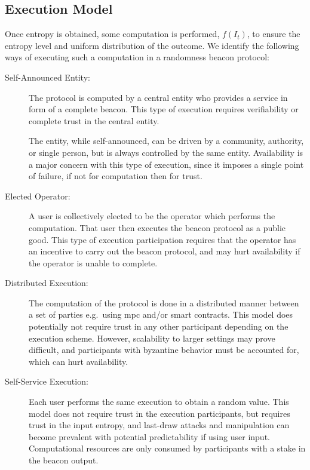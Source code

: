 \subsection{Execution Model}
Once entropy is obtained, some computation is performed, $f(I_t)$, to ensure the entropy level and uniform distribution of the outcome.
We identify the following ways of executing such a computation in a randomness beacon protocol:

\begin{description}
    \item[Self-Announced Entity:]
        The protocol is computed by a central entity who provides a service in form of a complete beacon.
        This type of execution requires verifiability or complete trust in the central entity.

        The entity, while self-announced, can be driven by a community, authority, or single person, but is always controlled by the same entity.
        Availability is a major concern with this type of execution, since it imposes a single point of failure, if not for computation then for trust.

    \item[Elected Operator:]
        A user is collectively elected to be the operator which performs the computation.
        That user then executes the beacon protocol as a public good.
        This type of execution participation requires that the operator has an incentive to carry out the beacon protocol, and may hurt availability if the operator is unable to complete.

    \item[Distributed Execution:]
        The computation of the protocol is done in a distributed manner between a set of parties e.g.\ using \gls{mpc} and/or smart contracts.
        This model does potentially not require trust in any other participant depending on the execution scheme.
        However, scalability to larger settings may prove difficult, and participants with byzantine behavior must be accounted for, which can hurt availability.

    \item[Self-Service Execution:]
        Each user performs the same execution to obtain a random value.
        This model does not require trust in the execution participants, but requires trust in the input entropy, and last-draw attacks and manipulation can become prevalent with potential predictability if using user input.
        Computational resources are only consumed by participants with a stake in the beacon output.
\end{description}

